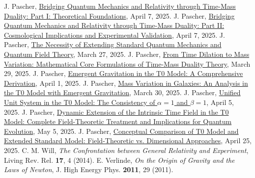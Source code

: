 \documentclass[12pt,a4paper]{article}
\begin{document}
	\begin{thebibliography}{99}
		 J. Pascher, \href{https://github.com/jpascher/T0-Time-Mass-Duality/tree/main/2/pdf/English/QMRelTimeMassPart1En.pdf}{Bridging Quantum Mechanics and Relativity through Time-Mass Duality: Part I: Theoretical Foundations}, April 7, 2025.
		 J. Pascher, \href{https://github.com/jpascher/T0-Time-Mass-Duality/tree/main/2/pdf/English/QMRelTimeMassPart2En.pdf}{Bridging Quantum Mechanics and Relativity through Time-Mass Duality: Part II: Cosmological Implications and Experimental Validation}, April 7, 2025.
		 J. Pascher, \href{https://github.com/jpascher/T0-Time-Mass-Duality/tree/main/2/pdf/English/NotwendigkeitQMErweiterungEn.pdf}{The Necessity of Extending Standard Quantum Mechanics and Quantum Field Theory}, March 27, 2025.
		 J. Pascher, \href{https://github.com/jpascher/T0-Time-Mass-Duality/tree/main/2/pdf/English/MathZeitMasseLagrangeEn.pdf}{From Time Dilation to Mass Variation: Mathematical Core Formulations of Time-Mass Duality Theory}, March 29, 2025.
		 J. Pascher, \href{https://github.com/jpascher/T0-Time-Mass-Duality/tree/main/2/pdf/English/EmergentGravT0En.pdf}{Emergent Gravitation in the T0 Model: A Comprehensive Derivation}, April 1, 2025.
		 J. Pascher, \href{https://github.com/jpascher/T0-Time-Mass-Duality/tree/main/2/pdf/English/MassVarGalaxienEn.pdf}{Mass Variation in Galaxies: An Analysis in the T0 Model with Emergent Gravitation}, March 30, 2025.
		 J. Pascher, \href{https://github.com/jpascher/T0-Time-Mass-Duality/tree/main/2/pdf/English/Alpha1Beta1KonsistenzEn.pdf}{Unified Unit System in the T0 Model: The Consistency of $\alpha = 1$ and $\beta = 1$}, April 5, 2025.
		 J. Pascher, \href{https://github.com/jpascher/T0-Time-Mass-Duality/tree/main/2/pdf/English/DynamicTF-SchrodingerExtensions_En.pdf}{Dynamic Extension of the Intrinsic Time Field in the T0 Model: Complete Field-Theoretic Treatment and Implications for Quantum Evolution}, May 5, 2025.
		 J. Pascher, \href{https://github.com/jpascher/T0-Time-Mass-Duality/tree/main/2/pdf/English/T0vsESM_ConceptualAnalysisEn.pdf}{Conceptual Comparison of T0 Model and Extended Standard Model: Field-Theoretic vs. Dimensional Approaches}, April 25, 2025.
		 C. M. Will, \textit{The Confrontation between General Relativity and Experiment}, Living Rev. Rel. \textbf{17}, 4 (2014).
		 E. Verlinde, \textit{On the Origin of Gravity and the Laws of Newton}, J. High Energy Phys. \textbf{2011}, 29 (2011).
	\end{thebibliography}
	
\end{document}
